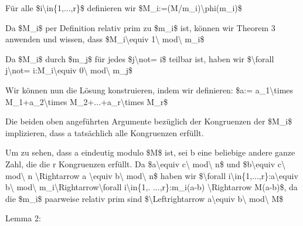 \documentclass[a4paper]{article}
\begin{document}
\begin{multicols}{3}
\begin{itemize*}
\begin{itemize*}
                  \begin{itemize*} \item Für alle \$i\textbackslash in\{1,...,r\}\$ definieren wir \$M\_i:=(M/m\_i)\textbackslash phi(m\_i)\$ \item Da \$M\_i\$ per Definition relativ prim zu \$m\_i\$ ist, können wir Theorem 3 anwenden und wissen, dass \$M\_i\textbackslash equiv 1\textbackslash{} mod\textbackslash{} m\_i\$ \item Da \$M\_i\$ durch \$m\_j\$ für jedes \$j\textbackslash not= i\$ teilbar ist, haben wir \$\textbackslash forall j\textbackslash not= i:M\_i\textbackslash equiv 0\textbackslash{} mod\textbackslash{} m\_j\$ \item Wir können nun die Lösung konstruieren, indem wir definieren: \$a:= a\_1\textbackslash times M\_1+a\_2\textbackslash times M\_2+...+a\_r\textbackslash times M\_r\$ \item Die beiden oben angeführten Argumente bezüglich der Kongruenzen der \$M\_i\$ implizieren, dass a tatsächlich alle Kongruenzen erfüllt. \item Um zu sehen, dass a eindeutig modulo \$M\$ ist, sei b eine beliebige andere ganze Zahl, die die r Kongruenzen erfüllt. Da \$a\textbackslash equiv c\textbackslash{} mod\textbackslash{} n\$ und \$b\textbackslash equiv c\textbackslash{} mod\textbackslash{} n \textbackslash Rightarrow a \textbackslash equiv b\textbackslash{} mod\textbackslash{} n\$ haben wir \$\textbackslash forall i\textbackslash in\{1,...,r\}:a\textbackslash equiv b\textbackslash{} mod\textbackslash{} m\_i\textbackslash Rightarrow\textbackslash forall i\textbackslash in\{1,. ...,r\}:m\_i\textbar(a-b) \textbackslash Rightarrow M\textbar(a-b)\$, da die \$m\_i\$ paarweise relativ prim sind \$\textbackslash Leftrightarrow a\textbackslash equiv b\textbackslash{} mod\textbackslash{} M\$ \end{itemize*}
            \end{itemize*}
            \item
            Lemma 2:


\end{itemize*}
\end{multicols}
\end{document}
